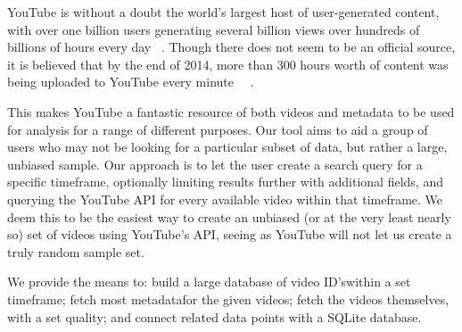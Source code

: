 
YouTube is without a doubt the world's largest host of user-generated content,
with over one billion users generating several billion
views over hundreds of billions of hours every day ~\cite{officialstats}. Though
there does not seem to be an official source, it is believed that by the end of
2014, more than 300 hours worth of content was being uploaded to YouTube every
minute ~\cite{dagensmediastats}~\cite{reelseostats}.

This makes YouTube a fantastic resource of both videos and metadata to be used
for analysis for a range of different purposes. Our tool aims to aid a group of
users who may not be looking for a particular subset of data, but rather a
large, unbiased sample. Our approach is to let the user create a search query
for a specific timeframe, optionally limiting results further with additional
fields, and querying the YouTube API for every available video within that
timeframe. We deem this to be the easiest way to create an unbiased (or at the
very least nearly so) set of videos using YouTube's API, seeing as YouTube will
not let us create a truly random sample set\footnonemark[3].

We provide the means to: build a large database
of video ID's\footnotemark[1] within a set timeframe; fetch
most metadata\footnotemark[2] for the given videos; fetch the videos
themselves, with a set quality; and connect related data points with a
SQLite database.




